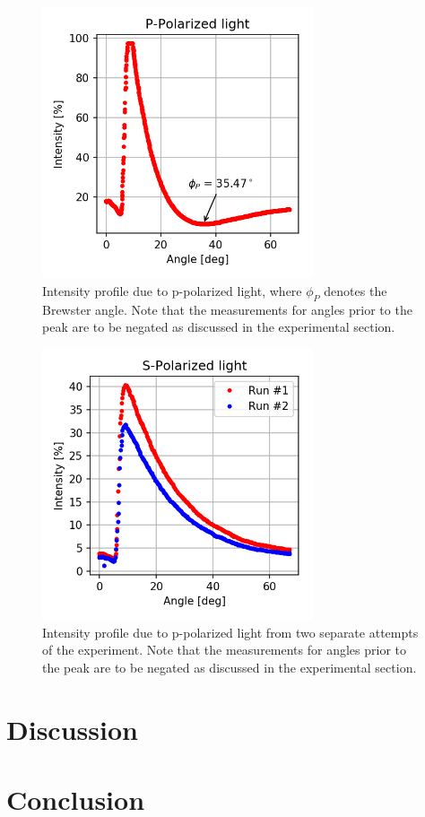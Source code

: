 \documentclass[11pt,a4paper]{article}
\begin{document}
  \begin{figure}[H]
    \center
    \includegraphics[width=8cm]{scripts/ppolar.png}
    \caption{Intensity profile due to p-polarized light, where $\phi_P$ denotes the Brewster angle. Note that the measurements for angles prior to the peak are to be negated as discussed in the experimental section.}
  \end{figure}

  \begin{figure}[H]
    \center
    \includegraphics[width=8cm]{scripts/spolar.png}
    \caption{Intensity profile due to p-polarized light from two separate attempts of the experiment. Note that the measurements for angles prior to the peak are to be negated as discussed in the experimental section.}
  \end{figure}

\section{\label{sect:discuss}Discussion}

\section{\label{sect:conclusion}Conclusion}

\onecolumn




\end{document}
